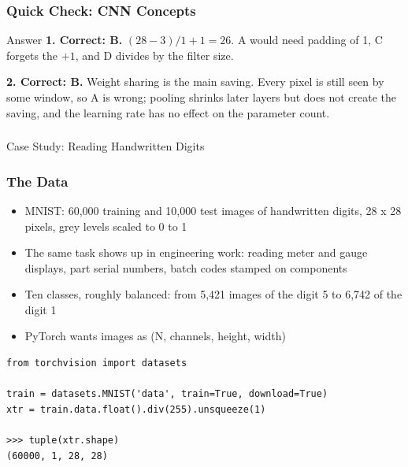 \begin{frame}[fragile]\frametitle{Quick Check: CNN Concepts}
\begin{block}{Answer}
\textbf{1. Correct: B.} $(28 - 3)/1 + 1 = 26$. A would need padding of 1, C forgets the $+1$, and D divides by the filter size.

\textbf{2. Correct: B.} Weight sharing is the main saving. Every pixel is still seen by some window, so A is wrong; pooling shrinks later layers but does not create the saving, and the learning rate has no effect on the parameter count.
\end{block}
\end{frame}

\begin{frame}[fragile]\frametitle{}
\begin{center}
{\Large Case Study: Reading Handwritten Digits}
\end{center}
\end{frame}

\begin{frame}[fragile]\frametitle{The Data}
\begin{itemize}
\item MNIST: 60,000 training and 10,000 test images of handwritten digits, 28 x 28 pixels, grey levels scaled to 0 to 1
\item The same task shows up in engineering work: reading meter and gauge displays, part serial numbers, batch codes stamped on components
\item Ten classes, roughly balanced: from 5,421 images of the digit 5 to 6,742 of the digit 1
\item PyTorch wants images as (N, channels, height, width)
\end{itemize}
\begin{lstlisting}
from torchvision import datasets

train = datasets.MNIST('data', train=True, download=True)
xtr = train.data.float().div(255).unsqueeze(1)

>>> tuple(xtr.shape)
(60000, 1, 28, 28)
\end{lstlisting}
\end{frame}

